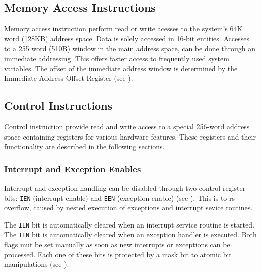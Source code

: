 \subsection{Memory Access Instructions}
\label{opcodes:memacc}

Memory access instruction perform read or write acesses to the system's 64K word (128KB) address space.
Data is solely accessed in 16-bit entities.
Accesses to a 255 word (510B) window in the main address space, can be done through an immediate
addressing. This offers faster access to frequently used system variables.
The offset of the immediate address window is determined by the Immediate Address Offset Register
(see ).

\subsection{Control Instructions}
\label{opcodes:ctrl}

Control instruction provide read and write access to a special 256-word address space containing registers for various hardware features.
These registers and their functionality are described in the following sections. 

\subsubsection{Interrupt and Exception Enables}
\label{opcodes:ctrl:irq}

Interrupt and exception handling can be disabled through two control register bits:
\texttt{IEN} (interrupt enable) and \texttt{EEN} (exception enable) (see ).
This is to \gls{rs} overflow, caused by nested execution of exceptions and interrupt sevice routines.

The \texttt{IEN} bit is automatically cleared when an interrupt service routine is started.
The \texttt{IEN} bit is automatically cleared when an exception handler is executed.
Both flags mut be set manually as soon as new interrupts or exceptions can be processed.
Each one of these bits is protected by a mask bit to atomic bit manipulations (see ).

